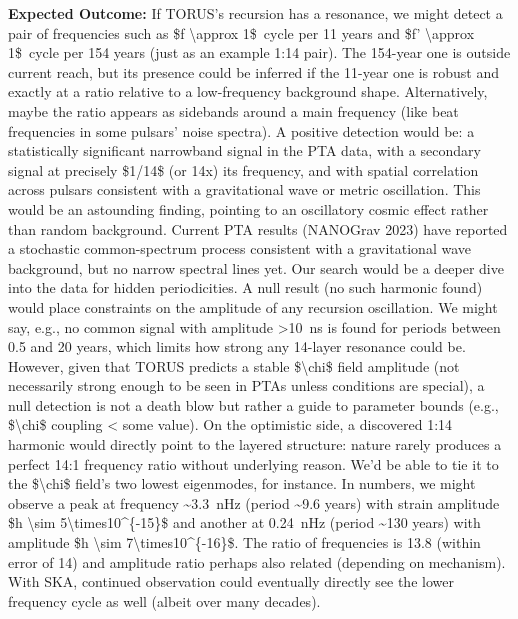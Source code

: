 \documentclass[]{article}
\begin{document}
\begin{enumerate}
  \textbf{Expected Outcome:} If TORUS's recursion has a resonance, we
  might detect a pair of frequencies such as \$f \textbackslash{}approx
  1\$~cycle per 11 years and \$f' \textbackslash{}approx 1\$~cycle per
  154 years (just as an example 1:14 pair). The 154-year one is outside
  current reach, but its presence could be inferred if the 11-year one
  is robust and exactly at a ratio relative to a low-frequency
  background shape. Alternatively, maybe the ratio appears as sidebands
  around a main frequency (like beat frequencies in some pulsars' noise
  spectra). A positive detection would be: a statistically significant
  narrowband signal in the PTA data, with a secondary signal at
  precisely \$1/14\$ (or 14x) its frequency, and with spatial
  correlation across pulsars consistent with a gravitational wave or
  metric oscillation. This would be an astounding finding, pointing to
  an oscillatory cosmic effect rather than random background. Current
  PTA results (NANOGrav 2023) have reported a stochastic common-spectrum
  process consistent with a gravitational wave background, but no narrow
  spectral lines yet. Our search would be a deeper dive into the data
  for hidden periodicities. A null result (no such harmonic found) would
  place constraints on the amplitude of any recursion oscillation. We
  might say, e.g., no common signal with amplitude \textgreater{}10~ns
  is found for periods between 0.5 and 20 years, which limits how strong
  any 14-layer resonance could be. However, given that TORUS predicts a
  stable \$\textbackslash{}chi\$ field amplitude (not necessarily strong
  enough to be seen in PTAs unless conditions are special), a null
  detection is not a death blow but rather a guide to parameter bounds
  (e.g., \$\textbackslash{}chi\$ coupling \textless{} some value). On
  the optimistic side, a discovered 1:14 harmonic would directly point
  to the layered structure: nature rarely produces a perfect 14:1
  frequency ratio without underlying reason. We'd be able to tie it to
  the \$\textbackslash{}chi\$ field's two lowest eigenmodes, for
  instance. In numbers, we might observe a peak at frequency
  \textasciitilde{}3.3~nHz (period \textasciitilde{}9.6 years) with
  strain amplitude \$h \textbackslash{}sim
  5\textbackslash{}times10\^{}\{-15\}\$ and another at 0.24~nHz (period
  \textasciitilde{}130 years) with amplitude \$h \textbackslash{}sim
  7\textbackslash{}times10\^{}\{-16\}\$. The ratio of frequencies is
  13.8 (within error of 14) and amplitude ratio perhaps also related
  (depending on mechanism). With SKA, continued observation could
  eventually directly see the lower frequency cycle as well (albeit over
  many decades).
\end{enumerate}
\end{document}
